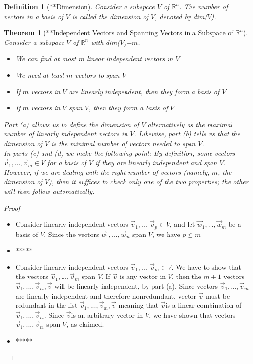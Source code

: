 \documentclass[10pt]{report}
\newtheorem{thm2}{Theorem}[section]
\newtheorem{def2}{Definition}[section]
\begin{document}
\begin{def2}[**Dimension]
Consider a subspace $V$ of $\mathbb{R}^n$. The number of vectors in a basis of $V$ is called the dimension of $V$, denoted by dim($V$).
\end{def2}
\begin{thm2}[**Independent Vectors and Spanning Vectors in a Subspace of $\mathbb{R}^n$]
Consider a subspace $V$ of $\mathbb{R}^n$ with dim($V$)=$m$.
\begin{itemize}
\item[a.] We can find at most $m$ linear independent vectors in $V$
\item[b.] We need at least $m$ vectors to span $V$
\item[c.] If $m$ vectors in $V$ are linearly independent, then they form a basis of $V$
\item[d.] If $m$ vectors in $V$ span $V$, then they form a basis of $V$
\end{itemize}
Part (a) allows us to define the dimension of $V$ alternatively as the maximal number of linearly independent vectors in $V$. Likewise, part (b) tells us that the dimension of $V$ is the minimal number of vectors needed to span $V$.\\
In parts (c) and (d) we make the following point: By definition, some vectors $\vec{v}_1, ..., \vec{v}_m\in V$ for a basis of $V$ if they are linearly independent and span $V$. However, if we are dealing with the right number of vectors (namely, $m$, the dimension of $V$), then it suffices to check only one of the two properties; the other will then follow automatically.
\end{thm2}
\begin{proof}
\begin{itemize}
\item[a.] Consider linearly independent vectors $\vec{v}_1, ..., \vec{v}_p\in V$, and let $\vec{w}_1, ..., \vec{w}_m$ be a basis of $V$. Since the vectors $\vec{w}_1, ..., \vec{w}_m$ span $V$, we have $p\leq m$
\item[b.] *****
\item[c.] Consider linearly independent vectors $\vec{v}_1, ..., \vec{v}_m\in V$. We have to show that the vectors $\vec{v}_1, ..., \vec{v}_m$ span $V$. If $\vec{v}$ is any vector in $V$, then the $m+1$ vectors $\vec{v}_1, ..., \vec{v}_m, \vec{v}$ will be linearly independent, by part (a). Since vectors $\vec{v}_1, ..., \vec{v}_m$ are linearly independent and therefore nonredundant, vector $\vec{v}$ must be redundant in the list $\vec{v}_1, ..., \vec{v}_m,\vec{v}$ meaning that $\vec{v}$is a linear combination of $\vec{v}_1, ..., \vec{v}_m$. Since $\vec{v}$is an arbitrary vector in $V$, we have shown that vectors $\vec{v}_1, ..., \vec{v}_m$ span $V$, as claimed.
\item[d.] *****
\end{itemize}
\end{proof}
\end{document}
